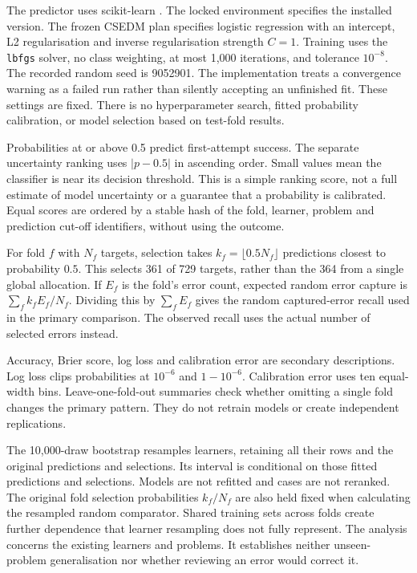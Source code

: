 The predictor uses scikit-learn \parencite{pedregosa2011scikit}. The locked environment specifies the installed version.
The frozen  CSEDM plan specifies logistic regression with an intercept, L2 regularisation and inverse
regularisation strength $C=1$. Training uses the \texttt{lbfgs} solver, no class weighting, at most 1,000 iterations, and tolerance
$10^{-8}$. The recorded random seed is 9052901. The implementation treats a convergence warning as a failed run rather than
silently accepting an unfinished fit. These settings are fixed. There is no hyperparameter search, fitted probability calibration,
or model selection based on test-fold results.

Probabilities at or above 0.5 predict first-attempt success. The separate uncertainty ranking uses $|p-0.5|$ in ascending order.
Small values mean the classifier is near its decision threshold. This is a simple ranking score, not a full estimate of model
uncertainty or a guarantee that a probability is calibrated. Equal scores are ordered by a stable hash of the fold, learner,
problem and prediction cut-off identifiers, without using the outcome.

For fold $f$ with $N_f$ targets, selection takes $k_f=\lfloor0.5N_f\rfloor$ predictions closest to probability $0.5$.
This selects 361 of 729 targets, rather than the 364 from a single global allocation. If $E_f$ is the fold's error count, expected
random error capture is $\sum_f k_f E_f/N_f$. Dividing this by $\sum_f E_f$ gives the random captured-error recall used in the
primary comparison. The observed recall uses the actual number of selected errors instead.

Accuracy, Brier score, log loss and calibration error are secondary descriptions. Log loss clips probabilities at $10^{-6}$
and $1-10^{-6}$. Calibration error uses ten equal-width bins. Leave-one-fold-out summaries check whether omitting a single fold
changes the primary pattern. They do not retrain models or create independent replications.

The 10,000-draw bootstrap resamples learners, retaining all their rows and the original predictions and selections. Its interval
is conditional on those fitted predictions and selections. Models are not refitted and cases are not reranked. The original
fold selection probabilities $k_f/N_f$ are also held fixed when calculating the resampled random comparator. Shared training
sets across folds create further dependence that learner resampling does not fully represent. The analysis concerns the existing
learners and problems. It establishes neither unseen-problem generalisation nor whether reviewing an error would correct it.
